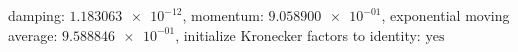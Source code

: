 damping: $\num[scientific-notation=true]{1.183063e-12}$, momentum: $\num[scientific-notation=true]{9.058900e-01}$, exponential moving average: $\num[scientific-notation=true]{9.588846e-01}$, initialize Kronecker factors to identity: $\text{yes}$